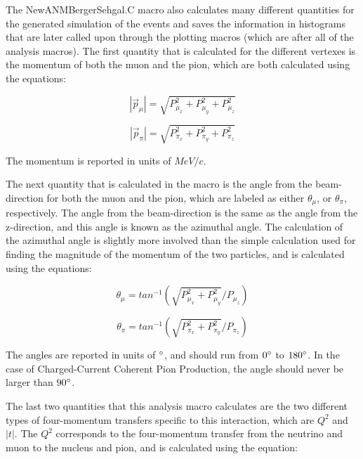 \documentclass[11pt]{article}
\begin{document}
The NewANMBergerSehgal.C macro also calculates many different quantities for the generated simulation of the events and saves the information in histograms that are later called upon through the plotting macros (which are after all of the analysis macros). The first quantity that is calculated for the different vertexes is the momentum of both the muon and the pion, which are both calculated using the equations:

\begin{equation}
|\vec{p}_\mu| = \sqrt{P_{\mu_x}^2 + P_{\mu_y}^2 + P_{\mu_z}^2}
\end{equation}

\begin{equation}
|\vec{p}_\pi| = \sqrt{P_{\pi_x}^2 + P_{\pi_y}^2 + P_{\pi_z}^2}
\end{equation}

\noindent
The momentum is reported in units of $MeV/c$.

The next quantity that is calculated in the macro is the angle from the beam-direction for both the muon and the pion, which are labeled as either $\theta_\mu$, or $\theta_\pi$, respectively. The angle from the beam-direction is the same as the angle from the z-direction, and this angle is known as the azimuthal angle. The calculation of the azimuthal angle is slightly more involved than the simple calculation used for finding the magnitude of the momentum of the two particles, and is calculated using the equations:

\begin{equation}
\theta_\mu = tan^{-1}(\sqrt{P_{\mu_x}^2 + P_{\mu_y}^2}/{P_{\mu_z}})
\end{equation}

\begin{equation}
\theta_\pi = tan^{-1}(\sqrt{P_{\pi_x}^2 + P_{\pi_y}^2}/{P_{\pi_z}})
\end{equation}

\noindent
The angles are reported in units of $\degree$, and should run from $0\degree$ to $180\degree$. In the case of Charged-Current Coherent Pion Production, the angle should never be larger than $90\degree$.

The last two quantities that this analysis macro calculates are the two different types of four-momentum transfers specific to this interaction, which are $Q^2$ and $|t|$. The $Q^2$ corresponds to the four-momentum transfer from the neutrino and muon to the nucleus and pion, and is calculated using the equation:
\end{document}
